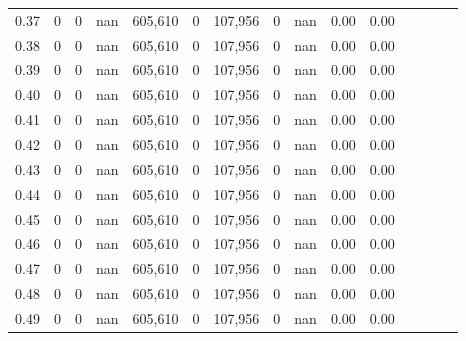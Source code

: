 \begin{tabular}{rrrcrrrrrrrrrrr}
0.37 &        0 &       0 &                                        nan &  605,610 &        0 &  107,956 &        0 &   nan &  0.00 &                         0.00 \\
0.38 &        0 &       0 &                                        nan &  605,610 &        0 &  107,956 &        0 &   nan &  0.00 &                         0.00 \\
0.39 &        0 &       0 &                                        nan &  605,610 &        0 &  107,956 &        0 &   nan &  0.00 &                         0.00 \\
0.40 &        0 &       0 &                                        nan &  605,610 &        0 &  107,956 &        0 &   nan &  0.00 &                         0.00 \\
0.41 &        0 &       0 &                                        nan &  605,610 &        0 &  107,956 &        0 &   nan &  0.00 &                         0.00 \\
0.42 &        0 &       0 &                                        nan &  605,610 &        0 &  107,956 &        0 &   nan &  0.00 &                         0.00 \\
0.43 &        0 &       0 &                                        nan &  605,610 &        0 &  107,956 &        0 &   nan &  0.00 &                         0.00 \\
0.44 &        0 &       0 &                                        nan &  605,610 &        0 &  107,956 &        0 &   nan &  0.00 &                         0.00 \\
0.45 &        0 &       0 &                                        nan &  605,610 &        0 &  107,956 &        0 &   nan &  0.00 &                         0.00 \\
0.46 &        0 &       0 &                                        nan &  605,610 &        0 &  107,956 &        0 &   nan &  0.00 &                         0.00 \\
0.47 &        0 &       0 &                                        nan &  605,610 &        0 &  107,956 &        0 &   nan &  0.00 &                         0.00 \\
0.48 &        0 &       0 &                                        nan &  605,610 &        0 &  107,956 &        0 &   nan &  0.00 &                         0.00 \\
0.49 &        0 &       0 &                                        nan &  605,610 &        0 &  107,956 &        0 &   nan &  0.00 &                         0.00 \\

\end{tabular}
